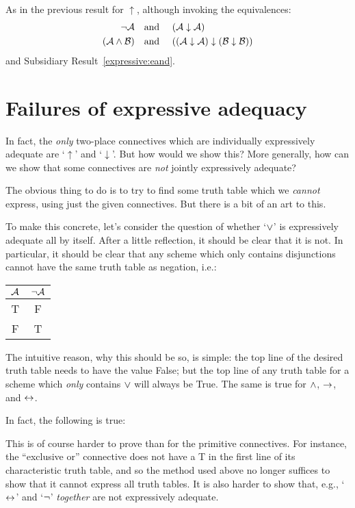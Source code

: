 As in the previous result for $\uparrow$, although invoking the equivalences:
		\begin{align*}
			\neg \mathcal{A} &\text{\quad and \quad} (\mathcal{A} \downarrow \mathcal{A})\\
			(\mathcal{A} \wedge \mathcal{B}) & \text{\quad and \quad} ((\mathcal{A} \downarrow \mathcal{A}) \downarrow (\mathcal{B} \downarrow \mathcal{B}))
		\end{align*}
and Subsidiary Result~\ref{expressive:eand}.


\section{Failures of expressive adequacy}

In fact, the \emph{only} two-place connectives which are individually expressively adequate are `$\uparrow$' and `$\downarrow$'. But how would we show this? More generally, how can we show that some connectives are \emph{not} jointly expressively adequate? 
 
The obvious thing to do is to try to find some truth table which we \emph{cannot} express, using just the given connectives. But there is a bit of an art to this.

To make this concrete, let's consider the question of whether `$\vee$' is expressively adequate all by itself. After a little reflection, it should be clear that it is not. In particular, it should be clear that any scheme which only contains disjunctions cannot have the same truth table as negation, i.e.:
				\begin{center}
				\begin{tabular}{c | c}
				$\mathcal{A}$ & $\neg \mathcal{A}$\\
				\hline
				 T & F \\
				 F & T
				\end{tabular}
				\end{center}
The intuitive reason, why this should be so, is simple: the top line of the desired truth table needs to have the value False; but the top line of any truth table for a scheme which \emph{only} contains $\vee$ will always be True. The same is true for $\wedge$, $\rightarrow$, and $\leftrightarrow$.

In fact, the following is true:
        

This is of course harder to prove than for the primitive connectives. For instance, the ``exclusive or'' connective does not have a T in the first line of its characteristic truth table, and so the method used above no longer suffices to show that it cannot express all truth tables.  It is also harder to show that, e.g., `$\leftrightarrow$' and `$\neg$' \emph{together} are not expressively adequate.
		


